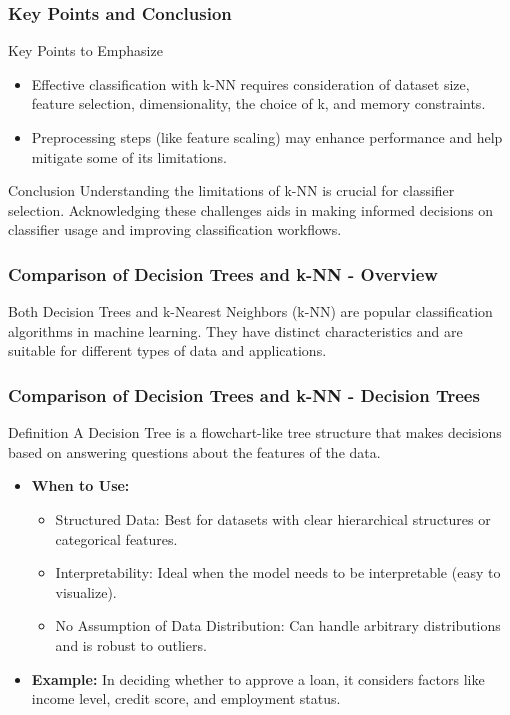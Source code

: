 \documentclass[aspectratio=169]{beamer}
\begin{document}
\begin{frame}[fragile]
    \frametitle{Key Points and Conclusion}
    \begin{block}{Key Points to Emphasize}
        \begin{itemize}
            \item Effective classification with k-NN requires consideration of dataset size, feature selection, dimensionality, the choice of k, and memory constraints.
            \item Preprocessing steps (like feature scaling) may enhance performance and help mitigate some of its limitations.
        \end{itemize}
    \end{block}

    \begin{block}{Conclusion}
        Understanding the limitations of k-NN is crucial for classifier selection. Acknowledging these challenges aids in making informed decisions on classifier usage and improving classification workflows.
    \end{block}
\end{frame}

\begin{frame}[fragile]
    \frametitle{Comparison of Decision Trees and k-NN - Overview}
    Both Decision Trees and k-Nearest Neighbors (k-NN) are popular classification algorithms in machine learning. They have distinct characteristics and are suitable for different types of data and applications.
\end{frame}

\begin{frame}[fragile]
    \frametitle{Comparison of Decision Trees and k-NN - Decision Trees}
    \begin{block}{Definition}
        A Decision Tree is a flowchart-like tree structure that makes decisions based on answering questions about the features of the data. 
    \end{block}
    
    \begin{itemize}
        \item \textbf{When to Use:}
            \begin{itemize}
                \item Structured Data: Best for datasets with clear hierarchical structures or categorical features.
                \item Interpretability: Ideal when the model needs to be interpretable (easy to visualize).
                \item No Assumption of Data Distribution: Can handle arbitrary distributions and is robust to outliers.
            \end{itemize}
        \item \textbf{Example:} In deciding whether to approve a loan, it considers factors like income level, credit score, and employment status.
    \end{itemize}
\end{frame}
\end{document}
